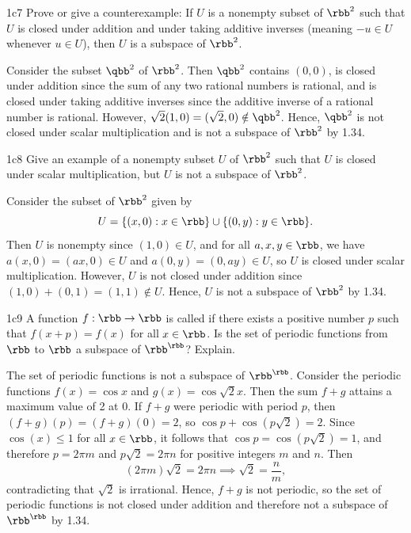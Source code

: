 \begin{exercise}{1c7}
    Prove or give a counterexample: If $U$ is a nonempty subset of $\rbb^2$ such that $U$ is closed under addition and under taking additive inverses (meaning $-u \in U$ whenever $u \in U$), then $U$ is a subspace of $\rbb^2$.
\end{exercise}

\begin{sol}
    Consider the subset $\qbb^2$ of $\rbb^2$.
	Then $\qbb^2$ contains $(0, 0)$, is closed under addition since the sum of any two rational numbers is rational, and is closed under taking additive inverses since the additive inverse of a rational number is rational.
    However, $\sqrt{2}(1, 0) = (\sqrt{2}, 0) \notin \qbb^2$.
    Hence, $\qbb^2$ is not closed under scalar multiplication and is not a subspace of $\rbb^2$ by 1.34.
\end{sol}

\begin{exercise}{1c8}
    Give an example of a nonempty subset $U$ of $\rbb^2$ such that $U$ is closed under scalar multiplication, but $U$ is not a subspace of $\rbb^2$.
\end{exercise}

\begin{sol}
    Consider the subset of $\rbb^2$ given by
    \[
    	U = \{(x, 0) : x \in \rbb\} \cup \{(0, y) : y \in \rbb\}.
    \]
    Then $U$ is nonempty since $(1, 0) \in U$, and for all $a, x, y \in \rbb$, we have $a(x, 0) = (ax, 0) \in U$ and $a(0, y) = (0, ay) \in U$, so $U$ is closed under scalar multiplication.
	However, $U$ is not closed under addition since $(1, 0) + (0, 1) = (1, 1) \notin U$.
	Hence, $U$ is not a subspace of $\rbb^2$ by 1.34.
\end{sol}

\begin{exercise}{1c9}
    A function $f : \rbb \to \rbb$ is called  if there exists a positive number $p$ such that $f(x + p) = f(x)$ for all $x \in \rbb$.
	Is the set of periodic functions from $\rbb$ to $\rbb$ a subspace of $\rbb^{\rbb}$?
	Explain.
\end{exercise}

\begin{sol}
    The set of periodic functions is not a subspace of $\rbb^{\rbb}$.
	Consider the periodic functions $f(x) = \cos x$ and $g(x) = \cos \sqrt 2x$.
	Then the sum $f + g$ attains a maximum value of 2 at 0.
	If $f + g$ were periodic with period $p$, then $(f + g)(p) = (f + g)(0) = 2$, so $\cos p + \cos(p\sqrt 2) = 2$.
    Since $\cos(x) \leq 1$ for all $x \in \rbb$, it follows that $\cos p = \cos(p\sqrt 2) = 1$, and therefore $p = 2\pi m$ and $p\sqrt 2 = 2\pi n$ for positive integers $m$ and $n$.
    Then
    \[
        (2\pi m) \sqrt{2} = 2\pi n \implies \sqrt{2} = \frac{n}{m},
    \]
    contradicting that $\sqrt{2}$ is irrational.
    Hence, $f + g$ is not periodic, so the set of periodic functions is not closed under addition and therefore not a subspace of $\rbb^{\rbb}$ by 1.34.
\end{sol}

